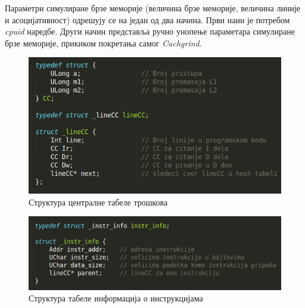\documentclass[12pt,oneside]{memoir}
\begin{document}
\indent Параметри симулиране брзе меморије (величина брзе меморије, величина линије и асоцијативност) одрешују се на један од два начина. Први наин је потребом \textit{cpuid} наредбе. Други начин представља ручно унопење параметара симулиране брзе меморије, прикиком покретања самог \textit{Cachgrind}.

\begin{figure}[h!]
\begin{center}
\includegraphics[scale=0.75]{slika11.png}
\end{center}
\caption{Структура централне табеле трошкова}
\label{fig:tabelaTroskova}
\end{figure}

\begin{figure}[h!]
\begin{center}
\includegraphics[scale=0.75]{slika12.png}
\end{center}
\caption{Структура табеле информација о инструкцијама}
\label{fig:infoInstr}
\end{figure}
\end{document}
